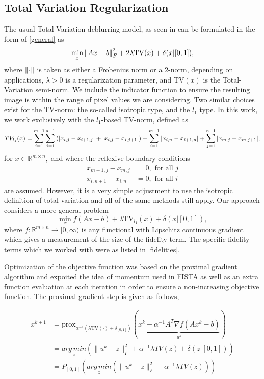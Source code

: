 \documentclass[10pt,a4paper]{article}
\newcommand{\prox}{\mathrm{prox}}
\newcommand{\R}{\mathbb{R}}
\newcommand{\AMz}{\underset{z}{arg\, min}}
\begin{document}
\subsection{Total Variation Regularization}
The usual Total-Variation deblurring model, as seen in \cite{TV} can be formulated in the form of \eqref{general} as 
\begin{equation} \label{tv_orig}
\min_{x} \norm{ Ax - b }_F^2 + 2 \lambda \mathrm{TV}(x)+ \delta(x | [0,1]),
\end{equation}
where $\norm{\cdot}$ is taken as either a Frobenius norm or a 2-norm, depending on applications,  $\lambda>0$ is a regularization parameter, and $\mathrm{TV}(x)$ is the Total-Variation semi-norm.  We include the indicator function to ensure the resulting image is within the range of pixel values we are considering.  Two similar choices exist for the TV-norm: the so-called isotropic type, and the $l_1$ type.  In this work, we work exclusively with the $l_1$-based TV-norm, defined as 
$$ TV_{l_1}(x) = \sum_{i=1}^{m-1} \sum_{j=1}^{n-1} \left( \abs{x_{i,j}  - x_{i+1,j} } + \abs{ x_{i,j} - x_{i,j+1}  } \right) + \sum_{i=1}^{m-1} \abs{ x_{i,n} - x_{i+1,n} } + \sum_{j=1}^{n-1} \abs{ x_{m,j} - x_{m,j+1 } },$$
 for $x \in \R^{m \times n},$ and where the reflexive boundary conditions
\begin{align*}
x_{m+1,j} - x_{m,j} &= 0, \textrm{ for all }j \\
 x_{i,n+1} - x_{i,n} &= 0, \textrm{ for all }i
\end{align*}
are assumed.  However, it is a very simple adjustment to use the isotropic definition of total variation and all of the same methods still apply. Our approach considers a more general problem
\begin{equation} \label{tv_ours}
\min_{x} f(Ax - b ) + \lambda \mathrm{TV}_{l_1}(x) + \delta(x | [0,1]),
\end{equation}
where $f: \R^{m \times n} \rightarrow [0,\infty)$ is any functional with Lipschitz continuous gradient which gives a measurement of the size of the fidelity term.  The specific fidelity terms which we worked with were as listed in \eqref{fidelities}.

Optimization of the objective function was based on the proximal gradient algorithm and expoited the idea of momentum used in FISTA as well as an extra function evaluation at each iteration in order to ensure a non-increasing objective function.  The proximal gradient step is given as follows,

\begin{align*}
x^{k+1} &= \prox_{\alpha^{-1}(\lambda \textrm{TV}(\cdot) + \delta_{[0,1]})} (\underbrace{x^k - \alpha^{-1} A^T\nabla f (Ax^k - b)}_{u^k}) \\
&= \AMz \left( \|u^k - z\|_F^2 + \alpha^{-1}\lambda TV(z) + \delta(z | [0,1]) \right) \\
&= P_{[0,1]}  \left( \AMz \left( \|u^k - z\|_F^2 + \alpha^{-1}\lambda TV(z) \right) \right)
\end{align*}
\end{document}
